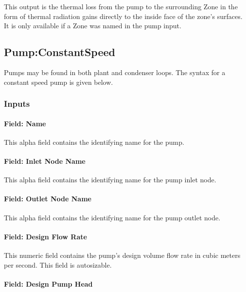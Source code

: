 This output is the thermal loss from the pump to the surrounding Zone in the form of thermal radiation gains directly to the inside face of the zone's surfaces. It is only available if a Zone was named in the pump input.

\subsection{Pump:ConstantSpeed}\label{pumpconstantspeed}

Pumps may be found in both plant and condenser loops. The syntax for a constant speed pump is given below.

\subsubsection{Inputs}\label{inputs-1-034}

\paragraph{Field: Name}\label{field-name-1-033}

This alpha field contains the identifying name for the pump.

\paragraph{Field: Inlet Node Name}\label{field-inlet-node-name-1-002}

This alpha field contains the identifying name for the pump inlet node.

\paragraph{Field: Outlet Node Name}\label{field-outlet-node-name-1-003}

This alpha field contains the identifying name for the pump outlet node.

\paragraph{Field: Design Flow Rate}\label{field-design-flow-rate-002}

This numeric field contains the pump's design volume flow rate in cubic meters per second. This field is autosizable.

\paragraph{Field: Design Pump Head}\label{field-design-pump-head-1}

